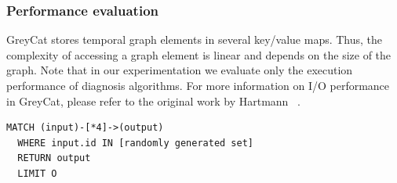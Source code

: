 %
%
% 
%

\subsubsection{Performance evaluation}
GreyCat stores temporal graph elements in several key/value maps. Thus, the complexity of accessing a graph element is linear and depends on the size of the graph. 
Note that in our experimentation we evaluate only the execution performance of diagnosis algorithms. For more information on I/O performance in GreyCat, please refer to the original work by Hartmann \etal~\cite{DBLP:conf/seke/0001FJRT17, DBLP:phd/basesearch/Hartmann16}.

\begin{lstlisting}[style=customc,caption=Traversal used during the experimentations,label=code:traversal-used,basicstyle=\scriptsize]
  MATCH (input)-[*4]->(output)
  WHERE input.id IN [randomly generated set]
  RETURN output
  LIMIT O
\end{lstlisting}


